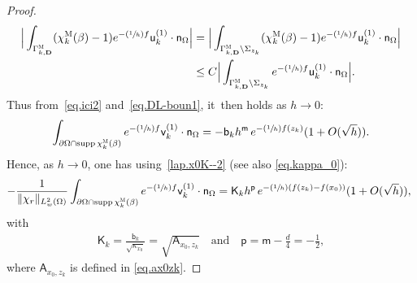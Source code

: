 \documentclass[JEP,XML,SOM,Unicode,NoEqCountersInSection,NoFloatCountersInSection,published]{cedram}
\newcommand{\Psfrac}[2]{(\sfrac{#1}{#2})}
\newcommand{\quand}{\quad\text{and}\quad}
\newcommand{\mbf}[1]{\mathbf{#1}}
\DeclareMathOperator\supp{supp}
\theoremstyle{plain}
\theoremstyle{definition}
\begin{document}
\begin{proof}
\[\begin{aligned}
\Big \vert\int_{ \Gamma_{k,\mbf D}^{ \textsc{M} }}
(\chi_k^{\textsc{M}} (\beta)-1) e^{-\Psfrac 1hf} \mathsf u_k^{(1)}
\cdot \mathsf n_\Omega\Big \vert &= \Big\vert\int_{ \Gamma_{k,\mbf
D}^{ \textsc{M} }\setminus \Sigma_{z_k}}
(\chi_k^{\textsc{M}} (\beta)-1) e^{-\Psfrac 1hf} \mathsf u_k^{(1)}
\cdot \mathsf n_\Omega\Big \vert\\
&\le C \Big \vert \int_{ \Gamma_{k,\mbf D}^{ \textsc{M} }\setminus \Sigma_{z_k}} e^{-\Psfrac 1hf} \mathsf u_k^{(1)} \cdot \mathsf n_\Omega\Big \vert.
\end{aligned}
\]
Thus from~\eqref{eq.ici2} and~\eqref{eq.DL-boun1}, it~then holds as $h\to 0$:
\[
\int_{\partial \Omega \cap\supp \chi_k^{\textsc{M}} (\beta) } e^{-\Psfrac 1hf} \mathsf v_k^{(1)} \cdot \mathsf n_\Omega =-\mathsf b_k h^{\mathsf m} \, e^{-\Psfrac 1h f(z_k)} (1+O(\sqrt h)).
\]
Hence, as $h\to 0$, one has using~\eqref{lap.x0K--2} (see also \eqref{eq.kappa_0}):\vspace*{-3pt}
\begin{align*}
-\frac{1}{\Vert \chi_r\Vert_{L^2_w(\Omega)}} \int_{\partial \Omega \cap\supp \chi_k^{\textsc{M}} (\beta) } e^{-\Psfrac 1hf} \mathsf v_k^{(1)} \cdot \mathsf n_\Omega = \mathsf K_kh^{\mathsf p}\, e^{-\Psfrac 1h(f(z_k)-f(x_0))} (1+O(\sqrt h)),\
\end{align*}
with\vspace*{-3pt}
\begin{align}\label{eq.constantK}
\mathsf K_k= \frac{\mathsf b_k}{\sqrt{\kappa_{x_0}}}=\sqrt{\mathsf A_{x_0,z_k}}\quand\mathsf p=\mathsf m-\frac d4= -\frac 12,
\end{align}
where $\mathsf A_{x_0,z_k}$ is defined in \eqref{eq.ax0zk}.


\end{proof}
\end{document}
